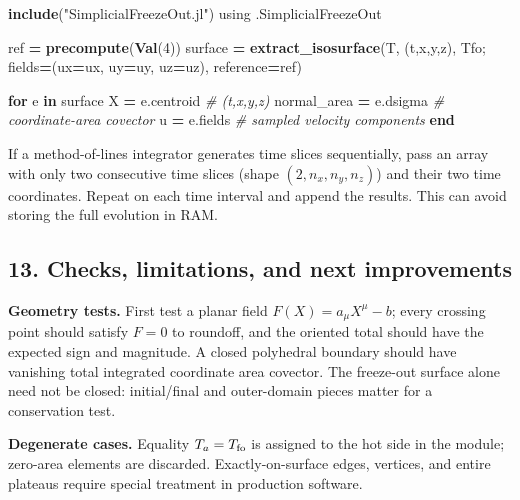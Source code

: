 \documentclass[
  10pt,
]{article}
\newenvironment{Shaded}{\begin{snugshade}}{\end{snugshade}}
\newcommand{\BuiltInTok}[1]{#1}
\newcommand{\CommentTok}[1]{\textcolor[rgb]{0.56,0.35,0.01}{\textit{#1}}}
\newcommand{\ConstantTok}[1]{\textcolor[rgb]{0.56,0.35,0.01}{#1}}
\newcommand{\ControlFlowTok}[1]{\textcolor[rgb]{0.13,0.29,0.53}{\textbf{#1}}}
\newcommand{\FloatTok}[1]{\textcolor[rgb]{0.00,0.00,0.81}{#1}}
\newcommand{\FunctionTok}[1]{\textcolor[rgb]{0.13,0.29,0.53}{\textbf{#1}}}
\newcommand{\ImportTok}[1]{#1}
\newcommand{\KeywordTok}[1]{\textcolor[rgb]{0.13,0.29,0.53}{\textbf{#1}}}
\newcommand{\NormalTok}[1]{#1}
\newcommand{\OperatorTok}[1]{\textcolor[rgb]{0.81,0.36,0.00}{\textbf{#1}}}
\newcommand{\StringTok}[1]{\textcolor[rgb]{0.31,0.60,0.02}{#1}}
\begin{document}
\begin{Shaded}
\begin{Highlighting}[]
\FunctionTok{include}\NormalTok{(}\StringTok{"SimplicialFreezeOut.jl"}\NormalTok{)}
\ImportTok{using} \BuiltInTok{.SimplicialFreezeOut}

\NormalTok{ref }\OperatorTok{=} \FunctionTok{precompute}\NormalTok{(}\FunctionTok{Val}\NormalTok{(}\FloatTok{4}\NormalTok{))}
\NormalTok{surface }\OperatorTok{=} \FunctionTok{extract\_isosurface}\NormalTok{(T, (t,x,y,z), Tfo;}
\NormalTok{    fields}\OperatorTok{=}\NormalTok{(ux}\OperatorTok{=}\NormalTok{ux, uy}\OperatorTok{=}\NormalTok{uy, uz}\OperatorTok{=}\NormalTok{uz), reference}\OperatorTok{=}\NormalTok{ref)}

\ControlFlowTok{for} \ConstantTok{e} \KeywordTok{in}\NormalTok{ surface}
\NormalTok{    X }\OperatorTok{=} \ConstantTok{e}\NormalTok{.centroid       }\CommentTok{\# (t,x,y,z)}
\NormalTok{    normal\_area }\OperatorTok{=} \ConstantTok{e}\NormalTok{.dsigma  }\CommentTok{\# coordinate{-}area covector}
\NormalTok{    u }\OperatorTok{=} \ConstantTok{e}\NormalTok{.fields         }\CommentTok{\# sampled velocity components}
\ControlFlowTok{end}
\end{Highlighting}
\end{Shaded}

If a method-of-lines integrator generates time slices sequentially, pass
an array with only two consecutive time slices (shape
\((2,n_x,n_y,n_z)\)) and their two time coordinates. Repeat on each time
interval and append the results. This can avoid storing the full
evolution in RAM.

\subsection{13. Checks, limitations, and next
improvements}\label{checks-limitations-and-next-improvements}

\textbf{Geometry tests.} First test a planar field
\(F(X)=a_\mu X^\mu-b\); every crossing point should satisfy \(F=0\) to
roundoff, and the oriented total should have the expected sign and
magnitude. A closed polyhedral boundary should have vanishing total
integrated coordinate area covector. The freeze-out surface alone need
not be closed: initial/final and outer-domain pieces matter for a
conservation test.

\textbf{Degenerate cases.} Equality \(T_a=T_{\rm fo}\) is assigned to
the hot side in the module; zero-area elements are discarded.
Exactly-on-surface edges, vertices, and entire plateaus require special
treatment in production software.
\end{document}
